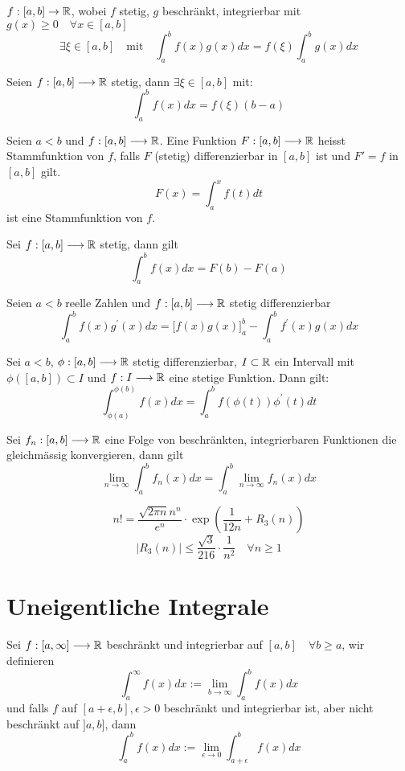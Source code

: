 \Satz[Cauchy] $ f: [a, b] \rightarrow \mathbb{R}$, wobei $f$ stetig, $g$ beschränkt, integrierbar mit $g(x) \geq 0 \quad \forall x \in [a,b]$
\[ \exists \xi \in [a, b] \quad \text{mit} \quad \int_a^b f(x) g(x) dx = f(\xi) \int_a^b g(x) dx  \]

\Satz[Mittelwertsatz] Seien $f : [a,b] \longrightarrow \mathbb{R}$ stetig, dann $\exists \xi \in [a,b]$ mit:
$$\int_a^b f(x) dx = f(\xi)(b-a)$$


\Satz[Stammfunktion] Seien $a < b$ und $f : [a,b] \longrightarrow \mathbb{R}$. Eine Funktion $F : [a,b] \longrightarrow \mathbb{R}$  heisst Stammfunktion von $f$, falls $F$ (stetig) differenzierbar in $[a,b]$ ist und $F' = f$ in $[a,b]$ gilt. \\
$$F(x) = \int_a^x f(t) dt$$ ist eine Stammfunktion von $f$.

\Satz[Fundamentalsatz] Sei $f : [a,b] \longrightarrow \mathbb{R}$ stetig, dann gilt
$$\int_a^b f(x) dx = F(b)-F(a)$$

 Seien $a < b$ reelle Zahlen und $f : [a,b] \longrightarrow \mathbb{R}$ stetig differenzierbar
$$
\int_{a}^{b} f(x) g^{\prime}(x) dx = \Big[f(x)g(x)\Big]_a^b - \int_{a}^{b} f^{\prime}(x) g(x) dx
$$

\Satz[Substitution] Sei $a<b$, $\phi : [a,b] \longrightarrow \mathbb{R}$ stetig differenzierbar, $I \subset \mathbb{R}$ ein Intervall mit $\phi([a,b]) \subset I$ und $f: I \longrightarrow \mathbb{R}$ eine stetige Funktion. Dann gilt:
$$
\int_{\phi(a)}^{\phi(b)} f(x) dx=\int_{a}^{b} f(\phi(t)) \phi^{\prime}(t) dt
$$

\Satz Sei $f_n : [a,b] \longrightarrow \mathbb{R}$ eine Folge von beschränkten, integrierbaren Funktionen die gleichmässig konvergieren, dann gilt
$$
\lim_{n \rightarrow \infty} \int_a^b f_n(x) dx = \int_a^b \lim_{n \rightarrow \infty} f_n(x) dx
$$

\Satz[Stirling] 
$$
n !=\frac{\sqrt{2 \pi n} n^{n}}{e^{n}} \cdot \exp \left(\frac{1}{12 n}+R_{3}(n)\right)
$$
$$
\left|R_{3}(n)\right| \leqslant \frac{\sqrt{3}}{216} \cdot \frac{1}{n^{2}} \quad \forall n \geqslant 1
$$

\section{Uneigentliche Integrale}

\Def Sei $f:[a,\infty] \longrightarrow \mathbb{R}$ beschränkt und integrierbar auf $[a,b] \quad \forall b \geq a$, wir definieren
$$\int_a^\infty f(x) dx := \lim_{b \rightarrow \infty} \int_a^b f(x) dx$$
und falls $f$ auf $[a+\epsilon,b], \epsilon>0$ beschränkt und integrierbar ist, aber nicht beschränkt auf $]a,b]$, dann
$$\int_a^b f(x) dx := \lim_{\epsilon \rightarrow 0} \int_{a+\epsilon}^b f(x) dx$$

